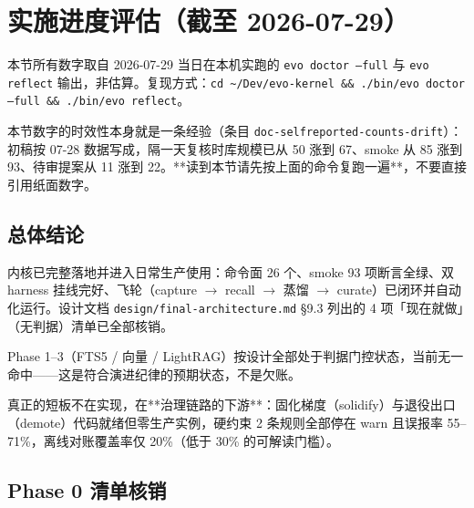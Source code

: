 \documentclass[12pt,a4paper]{ctexart}
\begin{document}
\section{实施进度评估（截至 2026-07-29）}

\begin{tipbox}
本节所有数字取自 2026-07-29 当日在本机实跑的 \texttt{evo doctor --full} 与 \texttt{evo reflect} 输出，非估算。复现方式：\texttt{cd \textasciitilde/Dev/evo-kernel \&\& ./bin/evo doctor --full \&\& ./bin/evo reflect}。

本节数字的时效性本身就是一条经验（条目 \texttt{doc-selfreported-counts-drift}）：初稿按 07-28 数据写成，隔一天复核时库规模已从 50 涨到 67、smoke 从 85 涨到 93、待审提案从 11 涨到 22。**读到本节请先按上面的命令复跑一遍**，不要直接引用纸面数字。
\end{tipbox}

\subsection{总体结论}

内核已完整落地并进入日常生产使用：命令面 26 个、smoke 93 项断言全绿、双 harness 挂线完好、飞轮（capture $\rightarrow$ recall $\rightarrow$ 蒸馏 $\rightarrow$ curate）已闭环并自动化运行。设计文档 \texttt{design/final-architecture.md} §9.3 列出的 4 项「现在就做」（无判据）清单已全部核销。

Phase 1--3（FTS5 / 向量 / LightRAG）按设计全部处于判据门控状态，当前无一命中——这是符合演进纪律的预期状态，不是欠账。

真正的短板不在实现，在**治理链路的下游**：固化梯度（solidify）与退役出口（demote）代码就绪但零生产实例，硬约束 2 条规则全部停在 warn 且误报率 55--71\%，离线对账覆盖率仅 20\%（低于 30\% 的可解读门槛）。

\subsection{Phase 0 清单核销}
\end{document}
